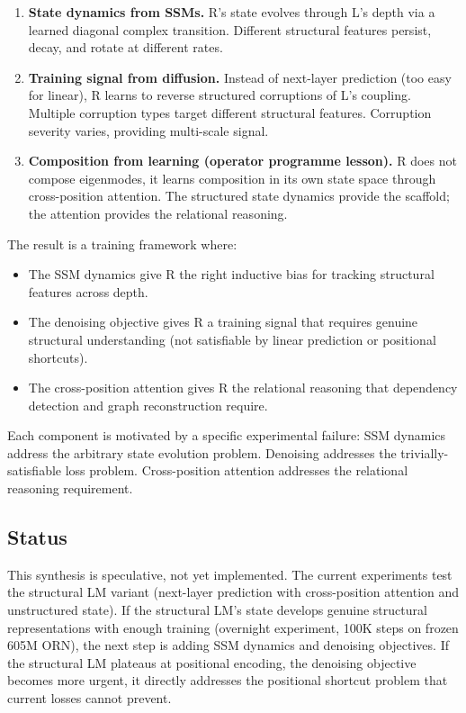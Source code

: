 \documentclass[11pt, a4paper]{article}
\theoremstyle{plain}
\theoremstyle{definition}
\theoremstyle{remark}
\begin{document}
\begin{enumerate}[nosep]
\item \textbf{State dynamics from SSMs.} R's state evolves through L's depth via a learned diagonal complex transition. Different structural features persist, decay, and rotate at different rates.

\item \textbf{Training signal from diffusion.} Instead of next-layer prediction (too easy for linear), R learns to reverse structured corruptions of L's coupling. Multiple corruption types target different structural features. Corruption severity varies, providing multi-scale signal.

\item \textbf{Composition from learning (operator programme lesson).} R does not compose eigenmodes, it learns composition in its own state space through cross-position attention. The structured state dynamics provide the scaffold; the attention provides the relational reasoning.
\end{enumerate}

The result is a training framework where:
\begin{itemize}[nosep]
\item The SSM dynamics give R the right inductive bias for tracking structural features across depth.
\item The denoising objective gives R a training signal that requires genuine structural understanding (not satisfiable by linear prediction or positional shortcuts).
\item The cross-position attention gives R the relational reasoning that dependency detection and graph reconstruction require.
\end{itemize}

Each component is motivated by a specific experimental failure:
SSM dynamics address the arbitrary state evolution problem.
Denoising addresses the trivially-satisfiable loss problem.
Cross-position attention addresses the relational reasoning requirement.

\subsection{Status}

This synthesis is speculative, not yet implemented.
The current experiments test the structural LM variant (next-layer prediction with cross-position attention and unstructured state).
If the structural LM's state develops genuine structural representations with enough training (overnight experiment, 100K steps on frozen 605M ORN), the next step is adding SSM dynamics and denoising objectives.
If the structural LM plateaus at positional encoding, the denoising objective becomes more urgent, it directly addresses the positional shortcut problem that current losses cannot prevent.
\end{document}
